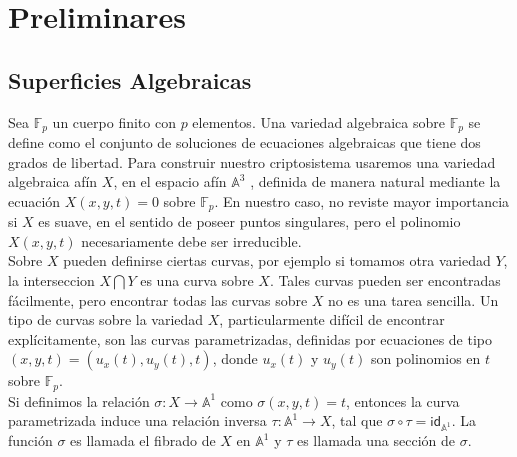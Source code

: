 \documentclass[11pt]{article}
\newcommand{\Fp}{\mathbb{F}_p}
\numberwithin{equation}{section} %
\numberwithin{figure}{section} %
\numberwithin{table}{section} %
\begin{document}
	\section{Preliminares}


		\subsection{Superficies Algebraicas}
		\label{21SA}

			Sea $\Fp$ un cuerpo finito con $p$ elementos. Una variedad algebraica sobre $\Fp$ se define como el conjunto de soluciones de ecuaciones algebraicas que tiene dos grados de libertad. Para construir nuestro criptosistema usaremos una variedad algebraica af\'in $X$, en el espacio af\'in $\mathbb{A}^3$ , definida de manera natural mediante la ecuaci\'on $X(x, y, t) = 0$ sobre $\Fp$. En nuestro caso, no reviste mayor importancia si $X$ es suave, en el sentido de poseer puntos singulares, pero el polinomio $X(x, y, t)$ necesariamente debe ser irreducible.\\

			Sobre $X$ pueden definirse ciertas curvas, por ejemplo si tomamos otra variedad $Y$, la interseccion $X\bigcap Y$ es una curva sobre $X$. Tales curvas pueden ser encontradas f\'acilmente, pero encontrar todas las curvas sobre $X$ no es una tarea sencilla. Un tipo de curvas sobre la variedad $X$, particularmente dif\'icil de encontrar expl\'icitamente, son las curvas parametrizadas, definidas por ecuaciones de tipo $(x,y,t)=(u_x(t),u_y(t),t)$, donde $u_x(t)$ y $u_y(t)$ son polinomios en $t$ sobre $\Fp$.\\

			Si definimos la relaci\'on $\sigma : X\rightarrow \mathbb{A}^1$ como $\sigma(x,y,t)=t$, entonces la curva parametrizada induce una relaci\'on inversa $\tau : \mathbb{A}^1\rightarrow X$, tal que $\sigma\circ\tau=\mathsf{id}_{\mathbb{A}^1}$. La funci\'on $\sigma$ es llamada el fibrado de $X$ en $\mathbb{A}^1$ y $\tau$ es llamada una secci\'on de $\sigma$.\\
\end{document}
